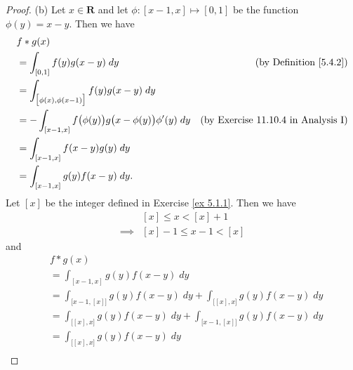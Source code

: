 \begin{proof}{(b)}
    Let \(x \in \mathbf{R}\) and let \(\phi : [x - 1, x] \mapsto [0, 1]\) be the function \(\phi(y) = x - y\).
    Then we have
    \begin{align*}
         & f * g(x)                                                                                                                   \\
         & = \int_{[0, 1]} f(y) g(x - y) \; dy                                           & \text{(by Definition \ref{5.4.2})}         \\
         & = \int_{\big[\phi(x), \phi(x - 1)\big]} f(y) g(x - y) \; dy                                                                \\
         & = -\int_{[x - 1, x]} f\big(\phi(y)\big) g\big(x - \phi(y)\big) \phi'(y) \; dy & \text{(by Exercise 11.10.4 in Analysis I)} \\
         & = \int_{[x - 1, x]} f(x - y) g(y) \; dy                                                                                    \\
         & = \int_{[x - 1, x]} g(y) f(x - y) \; dy.                                                                                   \\
    \end{align*}
    Let \([x]\) be the integer defined in Exercise \ref{ex 5.1.1}.
    Then we have
    \begin{align*}
                 & [x] \leq x < [x] + 1     \\
        \implies & [x] - 1 \leq x - 1 < [x]
    \end{align*}
    and
    \begin{align*}
         & f * g(x)                                                                                                                                             \\
         & = \int_{[x - 1, x]} g(y) f(x - y) \; dy                                                                                                              \\
         & = \int_{\big[x - 1, [x]\big]} g(y) f(x - y) \; dy + \int_{\big[[x], x\big]} g(y) f(x - y) \; dy                                                      \\
         & = \int_{\big[[x], x\big]} g(y) f(x - y) \; dy + \int_{\big[x - 1, [x]\big]} g(y) f(x - y) \; dy                                                      \\
         & = \int_{\big[[x], x\big]} g(y) f(x - y) \; dy                                                                                                        \\

\end{align*}
\end{proof}
